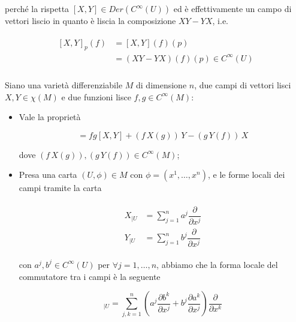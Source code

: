 perché la rispetta $ [X,Y] \in Der(C^{\infty}(U)) $ ed è effettivamente un campo di vettori liscio in quanto è liscia la composizione $ XY-YX $, i.e.

\begin{align}
	\begin{split}
		[X,Y]_{p}(f) &= [X,Y](f)(p)\\
		&= (XY-YX)(f)(p) \in C^{\infty}(U)\\
	\end{split}
\end{align}

\begin{definition}
	Siano una varietà differenziabile $ M $ di dimensione $ n $, due campi di vettori lisci $ X,Y \in \chi(M) $ e due funzioni lisce $ f,g \in C^{\infty}(M) $:
	
	\begin{itemize}
		\item Vale la proprietà
		
		\begin{equation}
			[f X, g Y] = f g [X,Y] + (f \, X(g)) \, Y - (g \, Y(f)) \, X
		\end{equation}
	
		dove $ (f \, X(g)), (g \, Y(f)) \in C^{\infty}(M) $;
	
		\item Presa una carta $ (U,\phi) \in M $ con $ \phi = (x^{1},\dots,x^{n}) $, e le forme locali dei campi tramite la carta
		
		\begin{align}
			\begin{split}
				X_{|U} &= \sum_{j=1}^{n} a^{j} \dfrac{\partial}{\partial x^{j}}\\
				Y_{|U} &= \sum_{j=1}^{n} b^{j} \dfrac{\partial}{\partial x^{j}}
			\end{split}
		\end{align}
	
		con $ a^{j},b^{j} \in C^{\infty}(U) $ per $ \forall j=1,\dots,n $, abbiamo che la forma locale del commutatore tra i campi è la seguente
		
		\begin{equation}
			[X,Y]_{|U} = \sum_{j,k=1}^{n} \left( a^{j} \dfrac{\partial b^{k}}{\partial x^{j}} + b^{j} \dfrac{\partial a^{k}}{\partial x^{j}} \right) \dfrac{\partial}{\partial x^{k}}
		\end{equation}
	\end{itemize}
\end{definition}

